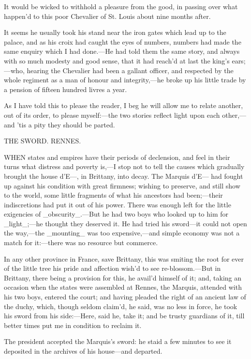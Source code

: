 \documentclass[twoside]{article}
\begin{document}
It would be wicked to withhold a pleasure from the good, in passing over
what happen’d to this poor Chevalier of St. Louis about nine months
after.

It seems he usually took his stand near the iron gates which lead up to
the palace, and as his croix had caught the eyes of numbers, numbers had
made the same enquiry which I had done.—He had told them the same story,
and always with so much modesty and good sense, that it had reach’d at
last the king’s ears;—who, hearing the Chevalier had been a gallant
officer, and respected by the whole regiment as a man of honour and
integrity,—he broke up his little trade by a pension of fifteen hundred
livres a year.

As I have told this to please the reader, I beg he will allow me to
relate another, out of its order, to please myself:—the two stories
reflect light upon each other,—and ’tis a pity they should be parted.




THE SWORD.
RENNES.


WHEN states and empires have their periods of declension, and feel in
their turns what distress and poverty is,—I stop not to tell the causes
which gradually brought the house d’E—, in Brittany, into decay.  The
Marquis d’E— had fought up against his condition with great firmness;
wishing to preserve, and still show to the world, some little fragments
of what his ancestors had been;—their indiscretions had put it out of his
power.  There was enough left for the little exigencies of
_obscurity_.—But he had two boys who looked up to him for _light_;—he
thought they deserved it.  He had tried his sword—it could not open the
way,—the _mounting_ was too expensive,—and simple economy was not a match
for it:—there was no resource but commerce.

In any other province in France, save Brittany, this was smiting the root
for ever of the little tree his pride and affection wish’d to see
re-blossom.—But in Brittany, there being a provision for this, he avail’d
himself of it; and, taking an occasion when the states were assembled at
Rennes, the Marquis, attended with his two boys, entered the court; and
having pleaded the right of an ancient law of the duchy, which, though
seldom claim’d, he said, was no less in force, he took his sword from his
side:—Here, said he, take it; and be trusty guardians of it, till better
times put me in condition to reclaim it.

The president accepted the Marquis’s sword: he staid a few minutes to see
it deposited in the archives of his house—and departed.
\end{document}
